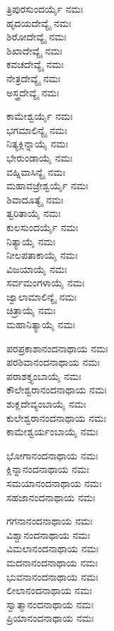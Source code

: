  ತ್ರಿಪುರಸುಂದರ್ಯೈ ನಮಃ\\
 ಹೃದಯದೇವ್ಯೈ ನಮಃ\\
 ಶಿರೋದೇವ್ಯೈ ನಮಃ\\
 ಶಿಖಾದೇವ್ಯೈ ನಮಃ\\
 ಕವಚದೇವ್ಯೈ ನಮಃ\\
 ನೇತ್ರದೇವ್ಯೈ ನಮಃ\\
 ಅಸ್ತ್ರದೇವ್ಯೈ ನಮಃ

 ಕಾಮೇಶ್ವರ್ಯೈ ನಮಃ\\
 ಭಗಮಾಲಿನ್ಯೈ ನಮಃ\\
 ನಿತ್ಯಕ್ಲಿನ್ನಾಯೈ ನಮಃ\\
 ಭೇರುಂಡಾಯೈ ನಮಃ\\
 ವಹ್ನಿವಾಸಿನ್ಯೈ ನಮಃ\\
 ಮಹಾವಜ್ರೇಶ್ವರ್ಯೈ ನಮಃ\\
 ಶಿವಾದೂತ್ಯೈ ನಮಃ\\
 ತ್ವರಿತಾಯೈ ನಮಃ\\
 ಕುಲಸುಂದರ್ಯೈ ನಮಃ\\
 ನಿತ್ಯಾಯೈ ನಮಃ\\
 ನೀಲಪತಾಕಾಯೈ ನಮಃ\\
 ವಿಜಯಾಯೈ ನಮಃ\\
 ಸರ್ವಮಂಗಳಾಯೈ ನಮಃ\\
 ಜ್ವಾಲಾಮಾಲಿನ್ಯೈ ನಮಃ\\
 ಚಿತ್ರಾಯೈ ನಮಃ\\
 ಮಹಾನಿತ್ಯಾಯೈ ನಮಃ


 ಪರಪ್ರಕಾಶಾನಂದನಾಥಾಯ ನಮಃ\\
 ಪರಶಿವಾನಂದನಾಥಾಯ ನಮಃ\\
 ಪರಾಶಕ್ತ್ಯಂಬಾಯೈ ನಮಃ\\
 ಕೌಲೇಶ್ವರಾನಂದನಾಥಾಯ ನಮಃ\\
 ಶುಕ್ಲದೇವ್ಯಂಬಾಯೈ ನಮಃ\\
 ಕುಲೇಶ್ವರಾನಂದನಾಥಾಯ ನಮಃ\\
 ಕಾಮೇಶ್ವರ್ಯಂಬಾಯೈ ನಮಃ

 ಭೋಗಾನಂದನಾಥಾಯ ನಮಃ\\
 ಕ್ಲಿನ್ನಾನಂದನಾಥಾಯ ನಮಃ\\
 ಸಮಯಾನಂದನಾಥಾಯ ನಮಃ\\
 ಸಹಜಾನಂದನಾಥಾಯ ನಮಃ

 ಗಗನಾನಂದನಾಥಾಯ ನಮಃ\\
 ವಿಶ್ವಾನಂದನಾಥಾಯ ನಮಃ\\
 ವಿಮಲಾನಂದನಾಥಾಯ ನಮಃ\\
 ಮದನಾನಂದನಾಥಾಯ ನಮಃ\\
 ಭುವನಾನಂದನಾಥಾಯ ನಮಃ\\
 ಲೀಲಾನಂದನಾಥಾಯ ನಮಃ\\
 ಸ್ವಾತ್ಮಾನಂದನಾಥಾಯ ನಮಃ\\
 ಪ್ರಿಯಾನಂದನಾಥಾಯ ನಮಃ
